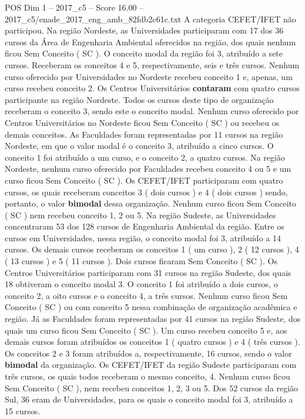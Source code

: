 \begin{textsample}{POS Dim 1 – 2017\_c5 – Score 16.00 – 2017\_c5/enade\_2017\_eng\_amb\_82fdb2c61c.txt}
A categoria CEFET/IFET não participou.
Na região Nordeste, as Universidades participaram com 17 dos 36 cursos da Área de Engenharia Ambiental oferecidos na região, dos quais nenhum ficou Sem Conceito ( SC ).
O conceito modal da região foi 3, atribuído a sete cursos.
Receberam os conceitos 4 e 5, respectivamente, seis e três cursos.
Nenhum curso oferecido por Universidades no Nordeste recebeu conceito 1 e, apenas, um curso recebeu conceito 2.
Os Centros Universitários \textbf{contaram} com quatro cursos participante na região Nordeste.
Todos os cursos deste tipo de organização receberam o conceito 3, sendo este o conceito modal.
Nenhum curso oferecido por Centros Universitários no Nordeste ficou Sem Conceito ( SC ) ou recebeu os demais conceitos.
As Faculdades foram representadas por 11 cursos na região Nordeste, em que o valor modal é o conceito 3, atribuído a cinco cursos.
O conceito 1 foi atribuído a um curso, e o conceito 2, a quatro cursos.
Na região Nordeste, nenhum curso oferecido por Faculdades recebeu conceito 4 ou 5 e um curso ficou Sem Conceito ( SC ).
Os CEFET/IFET participaram com quatro cursos, os quais receberam conceitos 3 ( dois cursos ) e 4 ( dois cursos ) sendo, portanto, o valor \textbf{bimodal} dessa organização.
Nenhum curso ficou Sem Conceito ( SC ) nem recebeu conceito 1, 2 ou 5.
Na região Sudeste, as Universidades concentraram 53 dos 128 cursos de Engenharia Ambiental da região.
Entre os cursos em Universidades, nessa região, o conceito modal foi 3, atribuído a 14 cursos.
Os demais cursos receberam os conceitos 1 ( um curso ), 2 ( 12 cursos ), 4 ( 13 cursos ) e 5 ( 11 cursos ).
Dois cursos ficaram Sem Conceito ( SC ).
Os Centros Universitários participaram com 31 cursos na região Sudeste, dos quais 18 obtiveram o conceito modal 3.
O conceito 1 foi atribuído a dois cursos, o conceito 2, a oito cursos e o conceito 4, a três cursos.
Nenhum curso ficou Sem Conceito ( SC ) ou com conceito 5 nessa combinação de organização acadêmica e região.
Já as Faculdades foram representadas por 41 cursos na região Sudeste, dos quais um curso ficou Sem Conceito ( SC ).
Um curso recebeu conceito 5 e, aos demais cursos foram atribuídos os conceitos 1 ( quatro cursos ) e 4 ( três cursos ).
Os conceitos 2 e 3 foram atribuídos a, respectivamente, 16 cursos, sendo o valor \textbf{bimodal} da organização.
Os CEFET/IFET da região Sudeste participaram com três cursos, os quais todos receberam o mesmo conceito, 4.
Nenhum curso ficou Sem Conceito ( SC ), nem recebeu conceitos 1, 2, 3 ou 5.
Dos 52 cursos da região Sul, 36 eram de Universidades, para os quais o conceito modal foi 3, atribuído a 15 cursos.

\end{textsample}
